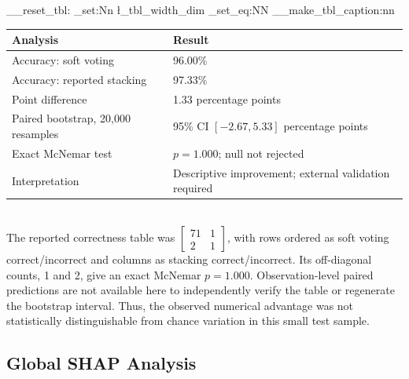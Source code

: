 \documentclass[a4paper,fleqn]{cas-dc}
\begin{document}
\par\nopagebreak\smallskip
\noindent\begin{minipage}{\columnwidth}
\centering
\makeatletter
\ExplSyntaxOn
\__reset_tbl:
\dim_set:Nn \l_tbl_width_dim { \columnwidth }
\cs_set_eq:NN \@makecaption \__make_tbl_caption:nn
\ExplSyntaxOff
\makeatother
{}
\label{tab:stats}
\footnotesize
\setlength{\tabcolsep}{3pt}
\renewcommand{\arraystretch}{1.05}
\begin{tabularx}{\columnwidth}{@{}Q{0.42\columnwidth}Y@{}}
\toprule
Analysis & Result \\
\midrule
Accuracy: soft voting & 96.00\% \\
Accuracy: reported stacking & 97.33\% \\
Point difference & 1.33 percentage points \\
Paired bootstrap, 20,000 resamples & 95\% CI $[-2.67,5.33]$ percentage points \\
Exact McNemar test & $p=1.000$; null not rejected \\
Interpretation & Descriptive improvement; external validation required \\
\bottomrule
\end{tabularx}
\end{minipage}
\par\smallskip

\\

The reported correctness table was $\begin{bmatrix}71&1\\2&1\end{bmatrix}$, with rows ordered as soft voting correct/incorrect and columns as stacking correct/incorrect. Its off-diagonal counts, 1 and 2, give an exact McNemar $p=1.000$. Observation-level paired predictions are not available here to independently verify the table or regenerate the bootstrap interval. Thus, the observed numerical advantage was not statistically distinguishable from chance variation in this small test sample.


\subsection{Global SHAP Analysis}
\label{sec:globalshap}
\end{document}

